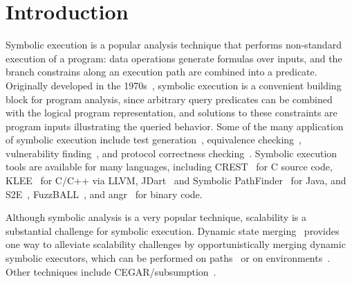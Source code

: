 \section{Introduction}

Symbolic execution is a popular analysis technique that performs non-standard execution of a program: data operations generate formulas over inputs, and the branch constrains along an execution path are combined into a predicate.
%
Originally developed in the 1970s~\cite{King1976,Clarke1976}, symbolic execution is a convenient building block for program analysis, since arbitrary query predicates can be combined with the logical program representation, and solutions to these constraints are program inputs illustrating the queried behavior.
%
Some of the many application of symbolic execution include
test generation~\cite{dart,cute}, equivalence checking~\cite{ramos,adaptorsynth}, vulnerability finding~\cite{driller,angr}, and protocol correctness checking~\cite{transport}.
%
Symbolic execution tools are available for many languages, including
CREST~\cite{BurnimS2008} for C source code, KLEE~\cite{CadarDE2008}
for C/C++ via LLVM, JDart~\cite{jdart2016} and Symbolic
PathFinder~\cite{spf} for Java, and S2E~\cite{ChipounovKC2012},
FuzzBALL~\cite{BabicMMS2011}, and angr~\cite{angr} for binary code.
%

Although symbolic analysis is a very popular technique, scalability is a substantial challenge for symbolic execution.
%
Dynamic state merging~\cite{kuznetsov} provides one way to
alleviate scalability challenges by opportunistically merging dynamic
symbolic executors, which can be performed on paths~ or on environments~.  
Other techniques include CEGAR/subsumption~.
 
